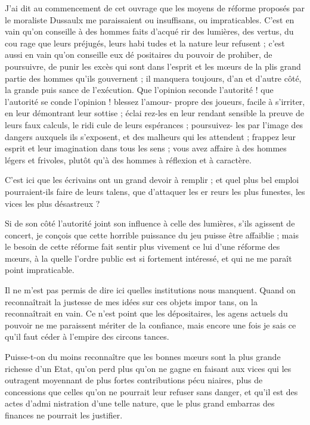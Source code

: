 J'ai dit au commencement de cet
ouvrage que les moyens de réforme
proposés par le moraliste Dussaulx
me paraissaient ou insuffisans, ou
impraticables. C'est en vain qu'on
conseille à des hommes faits d'acqué%
rir des lumières, des vertus, du cou%
rage que leurs préjugés, leurs habi
tudes et la nature leur refusent ; c'est
aussi en vain qu'on conseille eux dé%
positaires du pouvoir de prohiber, de
poursuivre, de punir les excès qui
sont dans l'esprit et les m{\oe}urs de la
plis grand partie des hommes qu'ils
gouvernent ; il manquera toujours,
d'an et d'autre côté, la grande puis%
sance de l'exécution. Que l'opinion
seconde l'autorité ! que l'autorité se%
conde l'opinion ! blessez l'amour-%
propre des joueurs, facile à s'irriter,
en leur démontrant leur sottise ; éclai%
rez-les en leur rendant sensible la
preuve de leurs faux calculs, le ridi%
cule de leurs espérances ; poursuivez-%
les par l'image des dangers auxquels
ils s'exposent, et des malheurs qui les 
attendent ; frappez leur esprit et leur
imagination dans tous les sens ; vous
avez affaire à des hommes légers et
frivoles, plutôt qu'à des hommes à
réflexion et à caractère.

C'est ici que les écrivains ont un
grand devoir à remplir ; et quel plus
bel emploi pourraient-ils faire de
leurs talens, que d'attaquer les er%
reurs les plus funestes, les vices les
plus désastreux ?

Si de son côté l'autorité joint son
influence à celle des lumières, s'ils
agissent de concert, je conçois que
cette horrible puissance du jeu puisse
être affaiblie ; mais le besoin de cette
réforme fait sentir plus vivement ce%
lui d'une réforme des m{\oe}urs, à la%
quelle l'ordre public est si fortement
intéressé, et qui ne me paraît point
impraticable.

Il ne m'est pas permis de dire ici
quelles institutions nous manquent.
Quand on reconnaîtrait la justesse 
de mes idées sur ces objets impor%
tans, on la reconnaîtrait en vain.
Ce n'est point que les dépositaires,
les agens actuels du pouvoir ne me
paraissent mériter de la confiance,
mais encore une fois je sais ce qu'il
faut céder à l'empire des circons%
tances.

Puisse-t-on du moins reconnaître
que les bonnes m{\oe}urs sont la plus
grande richesse d'un Etat, qu'on perd
plus qu'on ne gagne en faisant aux
vices qui les outragent moyennant
de plus fortes contributions pécu%
niaires, plus de concessions que celles
qu'on ne pourrait leur refuser sans
danger, et qu'il est des actes d'admi%
nistration d'une telle nature, que le
plus grand embarras des finances ne
pourrait les justifier.

